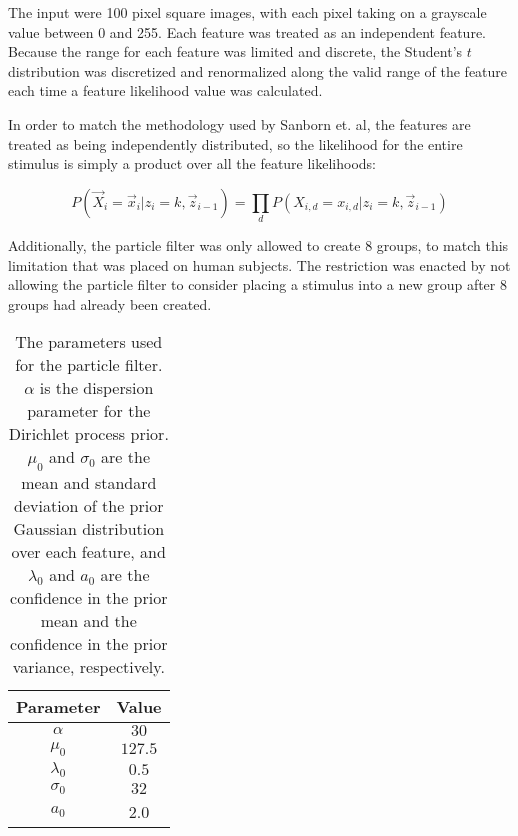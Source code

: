 The input were 100 pixel square images, with each pixel taking on a grayscale
value between 0 and 255. Each feature was treated as an independent feature.
Because the range for each feature was limited and discrete, the Student's $t$
distribution was discretized and renormalized along the valid range of the
feature each time a feature likelihood value was calculated. 

In order to match the methodology used by Sanborn et. al, the features are
treated as being independently distributed, so the likelihood for the entire
stimulus is simply a product over all the feature likelihoods:

\begin{equation}
P(\vec{X}_i = \vec{x}_i | z_i = k,  \vec{z}_{i-1}) =  \prod_d P(X_{i,d} =
x_{i,d} | z_i = k,  \vec{z}_{i-1})
\end{equation}

Additionally, the particle filter was only allowed to create 8 groups, to match
this limitation that was placed on human subjects.  The restriction was enacted
by not allowing the particle filter to consider placing a stimulus into a new
group after 8 groups had already been created.

\begin{table}
\centering
\begin{tabular}{c | c}
Parameter & Value \\ \hline
$\alpha$ & $30$ \\
$\mu_0$ & $127.5$ \\
$\lambda_0$ & $0.5$ \\
$\sigma_0$ & $32$ \\
$a_0$ & 2.0 \\
\end{tabular}
\label{tab:parameters}
\caption{The parameters used for the particle filter. $\alpha$ is the dispersion
parameter for the Dirichlet process prior. $\mu_0$ and $\sigma_0$ are the mean
and standard deviation of the prior Gaussian distribution over each feature, and
$\lambda_0$ and $a_0$ are the confidence in the prior mean and the confidence in the
prior variance, respectively.}
\end{table}



